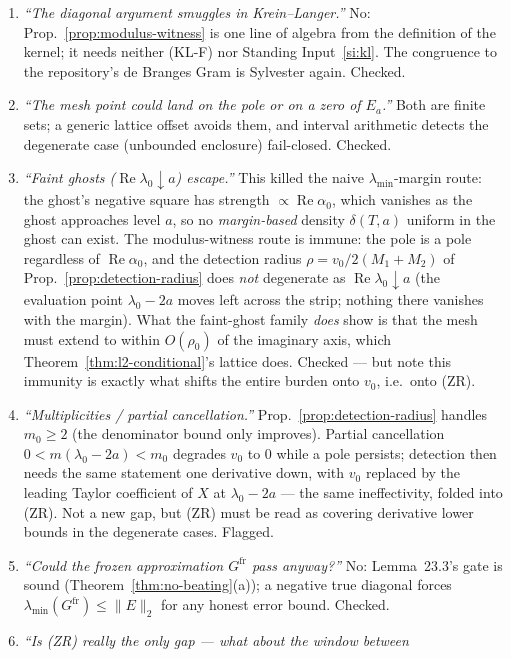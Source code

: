 \documentclass[11pt]{article}
\theoremstyle{definition}
\theoremstyle{remark}
\newcommand{\re}{\operatorname{Re}}
\begin{document}
\begin{enumerate}
\item \emph{``The diagonal argument smuggles in Krein--Langer.''} No:
Prop.~\ref{prop:modulus-witness} is one line of algebra from the definition
of the kernel; it needs neither (KL-F) nor Standing Input~\ref{si:kl}. The
congruence to the repository's de Branges Gram is Sylvester again. Checked.
\item \emph{``The mesh point could land on the pole or on a zero of $E_a$.''}
Both are finite sets; a generic lattice offset avoids them, and interval
arithmetic detects the degenerate case (unbounded enclosure) fail-closed.
Checked.
\item \emph{``Faint ghosts ($\re\lambda_0\downarrow a$) escape.''} This
killed the naive $\lambda_{\min}$-margin route: the ghost's negative square
has strength $\propto\re\alpha_0$, which vanishes as the ghost approaches
level $a$, so no \emph{margin-based} density $\delta(T,a)$ uniform in the
ghost can exist. The modulus-witness route is immune: the pole is a pole
regardless of $\re\alpha_0$, and the detection radius
$\rho=v_0/2(M_1+M_2)$ of Prop.~\ref{prop:detection-radius} does \emph{not}
degenerate as $\re\lambda_0\downarrow a$ (the evaluation point
$\lambda_0-2a$ moves left across the strip; nothing there vanishes with the
margin). What the faint-ghost family \emph{does} show is that the mesh must
extend to within $O(\rho_0)$ of the imaginary axis, which
Theorem~\ref{thm:l2-conditional}'s lattice does. Checked --- but note this
immunity is exactly what shifts the entire burden onto $v_0$, i.e.\ onto
(ZR).
\item \emph{``Multiplicities / partial cancellation.''}
Prop.~\ref{prop:detection-radius} handles $m_0\ge2$ (the denominator bound
only improves). Partial cancellation $0<m(\lambda_0-2a)<m_0$ degrades $v_0$
to $0$ while a pole persists; detection then needs the same statement one
derivative down, with $v_0$ replaced by the leading Taylor coefficient of
$X$ at $\lambda_0-2a$ --- the same ineffectivity, folded into (ZR). Not a
new gap, but (ZR) must be read as covering derivative lower bounds in the
degenerate cases. Flagged.
\item \emph{``Could the frozen approximation $G^{\mathrm{fr}}$ pass anyway?''} No:
Lemma~23.3's gate is sound (Theorem~\ref{thm:no-beating}(a)); a negative
true diagonal forces $\lambda_{\min}(G^{\mathrm{fr}})\le\|E\|_2$ for any honest
error bound. Checked.
\item \emph{``Is (ZR) really the only gap --- what about the window between
}
\end{enumerate}
\end{document}
